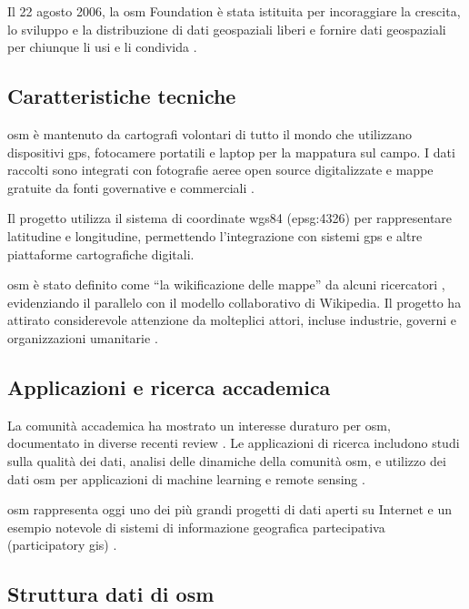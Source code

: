 Il 22 agosto 2006, la \acrfull{osm} Foundation è stata istituita per incoraggiare la crescita, lo sviluppo e
la distribuzione di dati geospaziali liberi e fornire dati geospaziali per chiunque li usi e
li condivida \cite{osmfoundation2006}.

\subsection{Caratteristiche tecniche}

\acrfull{osm} è mantenuto da cartografi volontari di tutto il mondo che utilizzano dispositivi \acrshort{gps},
fotocamere portatili e laptop per la mappatura sul campo. I dati raccolti sono integrati con fotografie aeree
open source digitalizzate e mappe gratuite da fonti governative e commerciali \cite{neis2012}.

Il progetto utilizza il sistema di coordinate \acrshort{wgs84} (\acrshort{epsg}:4326) per rappresentare
latitudine e longitudine, permettendo l'integrazione con sistemi \acrshort{gps} e
altre piattaforme cartografiche digitali.

\acrfull{osm} è stato definito come ``la wikificazione delle mappe'' da alcuni ricercatori \cite{sehra2013},
evidenziando il parallelo con il modello collaborativo di Wikipedia. Il progetto ha attirato considerevole attenzione
da molteplici attori, incluse industrie, governi e organizzazioni umanitarie \cite{fonte2022}.

\subsection{Applicazioni e ricerca accademica}

La comunità accademica ha mostrato un interesse duraturo per \acrfull{osm}, documentato in diverse recenti
review \cite{vargas2020, sehra2013}. Le applicazioni di ricerca includono studi sulla qualità dei dati,
analisi delle dinamiche della comunità \acrshort{osm}, e utilizzo dei dati \acrshort{osm} per applicazioni
di machine learning e remote sensing \cite{vargas2020}.

\acrfull{osm} rappresenta oggi uno dei più grandi progetti di dati aperti su Internet e un esempio notevole di sistemi
di informazione geografica partecipativa (participatory \acrshort{gis}) \cite{quinn2022}.

\subsection{Struttura dati di \acrfull{osm}}

